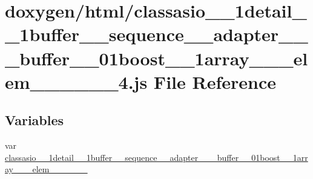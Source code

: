 \hypertarget{classasio__1__1detail__1__1buffer____sequence____adapter__3__01__buffer__00__01boost__1__1array_ec69ddb98f2aeb88bdfaf1b393a46f45}{}\section{doxygen/html/classasio\+\_\+\_\+1detail\+\_\+\_\+1buffer\+\_\+\+\_\+sequence\+\_\+\+\_\+adapter\+\_\+\_\+\_\+buffer\+\_\+\_\+01boost\+\_\+\_\+1array\+\_\+\_\+\_\+elem\+\_\+\_\+\_\+\_\+\_\+\_\+4.js File Reference}
\label{classasio__1__1detail__1__1buffer____sequence____adapter__3__01__buffer__00__01boost__1__1array_ec69ddb98f2aeb88bdfaf1b393a46f45}
\subsection*{Variables}
\begin{DoxyCompactItemize}
\item 
var \hyperlink{classasio__1__1detail__1__1buffer____sequence____adapter__3__01__buffer__00__01boost__1__1array_ec69ddb98f2aeb88bdfaf1b393a46f45_a0df56a901d79f37ac525b8e6cd068f6c}{classasio\+\_\+\_\+1detail\+\_\+\_\+1buffer\+\_\+\+\_\+sequence\+\_\+\+\_\+adapter\+\_\+\_\+\_\+buffer\+\_\+\_\+01boost\+\_\+\_\+1array\+\_\+\_\+\_\+elem\+\_\+\_\+\_\+\_\+\_\+\_}
\end{DoxyCompactItemize}


